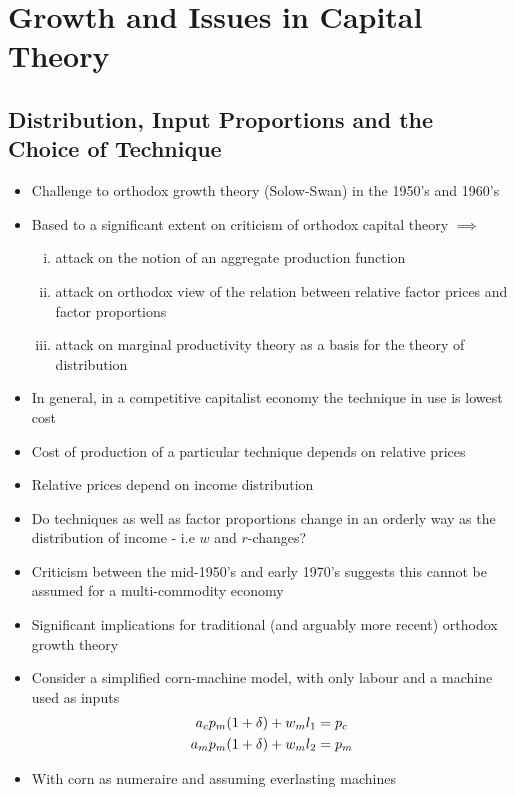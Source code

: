 \documentclass{article}
\begin{document}
\section{Growth and Issues in Capital Theory}
\subsection{Distribution, Input Proportions and the Choice of Technique}
	\begin{itemize}
		\item Challenge to orthodox growth theory (Solow-Swan) in the 1950's and 1960's
		\item Based to a significant extent on criticism of orthodox capital theory \( \implies \)
		\begin{enumerate}[(i)]
			\item attack on the notion of an aggregate production function
			\item attack on orthodox view of the relation between relative factor prices and factor proportions
			\item attack on marginal productivity theory as a basis for the theory of distribution
		\end{enumerate}
		\item In general, in a competitive capitalist economy the technique in use is lowest cost
		\item Cost of production of a particular technique depends on relative prices
		\item Relative prices depend on income distribution
		\item Do techniques as well as factor proportions change in an orderly way as the distribution of income - i.e \( w \) and \( r \)-changes?
		\item Criticism between the mid-1950's and early 1970's suggests this cannot be assumed for a multi-commodity economy
		\item Significant implications for traditional (and arguably more recent) orthodox growth theory
		\item Consider a simplified corn-machine model, with only labour and a machine used as inputs
		\begin{align}
			a_c p_m (1 + \delta) + w_m l_1 &= p_c \notag \\
			a_m p_m (1 + \delta) + w_m l_2 &= p_m \label{eq:5.1}
		\end{align}
		\item With corn as numeraire and assuming everlasting machines
		\begin{align}

\end{align}
\end{itemize}
\end{document}
